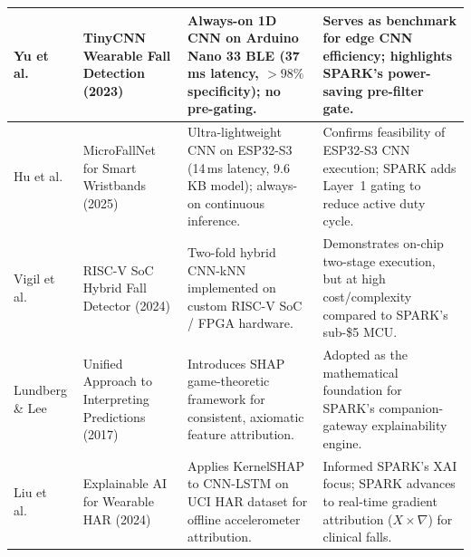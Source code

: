 \begin{longtable}{|>{\RaggedRight}p{0.8in}|>{\RaggedRight}p{1.3in}|>{\RaggedRight}p{1.7in}|>{\RaggedRight\arraybackslash}p{1.8in}|}
Yu et al.\ \cite{yu2023tinycnn} &
TinyCNN Wearable Fall Detection (2023) &
Always-on 1D CNN on Arduino Nano 33 BLE (37\,ms latency, $>98\%$ specificity); no pre-gating. &
Serves as benchmark for edge CNN efficiency; highlights SPARK's power-saving pre-filter gate. \\
\hline

Hu et al.\ \cite{hu2025microfallnet} &
MicroFallNet for Smart Wristbands (2025) &
Ultra-lightweight CNN on ESP32-S3 (14\,ms latency, 9.6\,KB model); always-on continuous inference. &
Confirms feasibility of ESP32-S3 CNN execution; SPARK adds Layer~1 gating to reduce active duty cycle. \\
\hline

Vigil et al.\ \cite{vigil2024fpga} &
RISC-V SoC Hybrid Fall Detector (2024) &
Two-fold hybrid CNN-kNN implemented on custom RISC-V SoC / FPGA hardware. &
Demonstrates on-chip two-stage execution, but at high cost/complexity compared to SPARK's sub-\$5 MCU. \\
\hline

Lundberg \& Lee \cite{lundberg2017shap} &
Unified Approach to Interpreting Predictions (2017) &
Introduces SHAP game-theoretic framework for consistent, axiomatic feature attribution. &
Adopted as the mathematical foundation for SPARK's companion-gateway explainability engine. \\
\hline

Liu et al.\ \cite{liu2024explainable} &
Explainable AI for Wearable HAR (2024) &
Applies KernelSHAP to CNN-LSTM on UCI HAR dataset for offline accelerometer attribution. &
Informed SPARK's XAI focus; SPARK advances to real-time gradient attribution ($X \times \nabla$) for clinical falls. \\
\hline

\end{longtable}
\endgroup